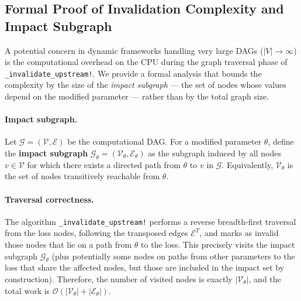 \documentclass{article}
\begin{document}
\subsection{Formal Proof of Invalidation Complexity and Impact Subgraph}
\label{sec:invalidation_proof}
A potential concern in dynamic frameworks handling very large DAGs ($|V| \to \infty$) is the computational overhead on the CPU during the graph traversal phase of \texttt{\_invalidate\_upstream!}. We provide a formal analysis that bounds the complexity by the size of the \emph{impact subgraph} — the set of nodes whose values depend on the modified parameter — rather than by the total graph size.

\paragraph{Impact subgraph.}
Let $\mathcal{G} = (\mathcal{V}, \mathcal{E})$ be the computational DAG. For a modified parameter $\theta$, define the \textbf{impact subgraph} $\mathcal{G}_{\theta} = (\mathcal{V}_{\theta}, \mathcal{E}_{\theta})$ as the subgraph induced by all nodes $v \in \mathcal{V}$ for which there exists a directed path from $\theta$ to $v$ in $\mathcal{G}$. Equivalently, $\mathcal{V}_{\theta}$ is the set of nodes transitively reachable from $\theta$.

\paragraph{Traversal correctness.}
The algorithm \texttt{\_invalidate\_upstream!} performs a reverse breadth-first traversal from the loss nodes, following the transposed edges $\mathcal{E}^T$, and marks as invalid those nodes that lie on a path from $\theta$ to the loss. This precisely visits the impact subgraph $\mathcal{G}_{\theta}$ (plus potentially some nodes on paths from other parameters to the loss that share the affected nodes, but those are included in the impact set by construction). Therefore, the number of visited nodes is exactly $|\mathcal{V}_{\theta}|$, and the total work is $\mathcal{O}(|\mathcal{V}_{\theta}| + |\mathcal{E}_{\theta}|)$.
\end{document}
